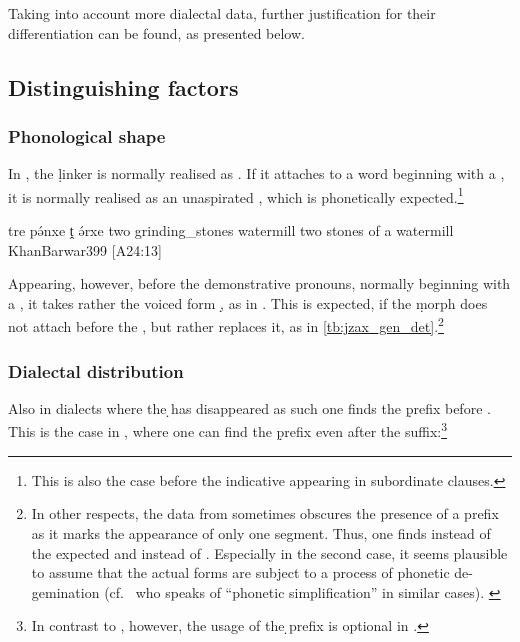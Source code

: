 Taking into account more dialectal data, further justification for their differentiation can be found, as presented below. 

\subsection{Distinguishing factors}

\subsubsection {Phonological shape}
In \Barw, the \d linker is normally realised as  \citep[396]{KhanBarwar}. If it attaches to a word beginning with a , it is normally realised as an unaspirated , which is phonetically expected.\footnote{This is also the case before the indicative  appearing in subordinate clauses.} 

{tre\cb{} pə́nxe ṱ\cb{} ə́rxe}
{two\cb{} grinding\_stones \lnk\cb{} watermill }
{two stones of a watermill}
{KhanBarwar}{399 {[A24:13]}}


Appearing, however, before the demonstrative pronouns, normally beginning with a , it takes rather the voiced form \d, as in . This is expected, if the \d morph does not attach before the , but rather replaces it, as in \vref{tb:jzax_gen_det}.\footnote{In other respects, the data from \Barw sometimes obscures the presence of a \gen* prefix as it marks the appearance of only one  segment. Thus, one finds  instead of the expected  and  instead of . Especially in the second case, it seems plausible to assume that the actual forms are subject to a process of phonetic de-gemination (cf.\ \cite[122]{CohenZakho} who speaks of \enquote{phonetic simplification} in similar cases). \label{ft:Barw_gen}}

\subsubsection {Dialectal distribution} \label{ss:gen_dialectal}

Also in dialects where the \d \lnk* has disappeared as such one finds the \d prefix before . This is the case in \JSan, where one can find the \d prefix even after the \ez* suffix:\footnote{In contrast to \JZax, however, the usage of the \d \gen* prefix is optional in \JSan.}

